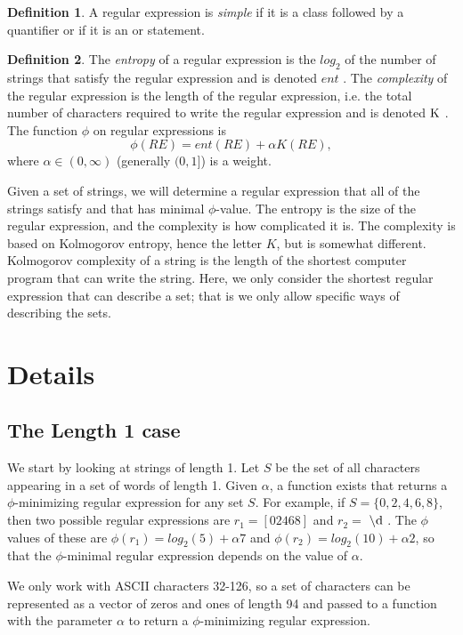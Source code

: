 \documentclass[11pt, oneside]{article}   	%
\theoremstyle{definition}
\newtheorem{definition}{Definition}
\newcommand{\dre}{$\backslash \textnormal{d}$ }
\newcommand{\K}{$ \textnormal{K}$ }
\newcommand{\entropy}{$ent$ }
\begin{document}
\begin{definition}
A regular expression is \textit{simple} if it is a class followed by a quantifier or if it is an or statement. 
\end{definition}

\begin{definition}
The \textit{entropy} of a regular expression is the $log_2$ of the number of strings that satisfy the regular expression and is denoted \entropy. The \textit{complexity} of the regular expression is the length of the regular expression, i.e. the total number of characters required to  write the regular expression and is denoted \K. 
The function $\phi$ on regular expressions is 
\begin{equation}
\phi(RE) = ent(RE) +\alpha K(RE),
\end{equation}
where $\alpha\in(0,\infty)$ (generally $(0,1]$) is a weight.
\end{definition}

Given a set of strings, we will determine a regular expression that all of the strings satisfy and that has minimal $\phi$-value. 
The entropy is the size of the regular expression, and the complexity is how complicated it is. 
The complexity is based on Kolmogorov entropy, hence the letter $K$, but is somewhat different. 
Kolmogorov complexity of a string is the length of the shortest computer program that can write the string. 
Here, we only consider the shortest regular expression that can describe a set; that is we only allow specific ways of describing the sets. 


\section{Details}

\subsection{The Length 1 case}

We start by looking at strings of length 1. Let  $S$ be the set of all characters appearing in a set of words of length 1. 
Given $\alpha$, a function exists that returns a $\phi$-minimizing regular expression for any set $S$. 
For example, if $S = \{0,2,4,6,8\}$, then two possible regular expressions are $r_1 = [02468]$ and $r_2 = $ \dre. 
The $\phi$ values of these are $\phi(r_1) = log_2(5) + \alpha 7$ and $\phi(r_2) = log_2(10) + \alpha 2$, 
so that the $\phi$-minimal regular expression depends on the value of $\alpha$. 

We only work with ASCII characters 32-126, so a set of characters can be represented as a vector of zeros and ones of length 94 and passed to a function with the parameter $\alpha$ to return a $\phi$-minimizing regular expression.
\end{document}
